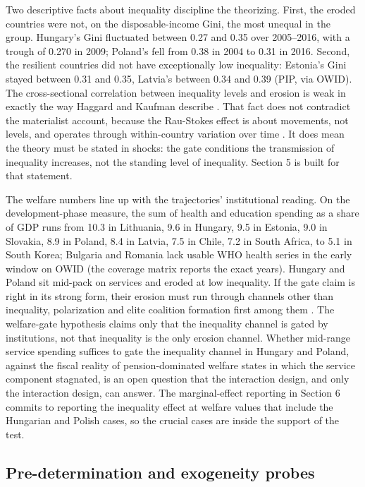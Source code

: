 Two descriptive facts about inequality discipline the theorizing. First, the eroded countries were not, on the disposable-income Gini, the most unequal in the group. Hungary's Gini fluctuated between 0.27 and 0.35 over 2005--2016, with a trough of 0.270 in 2009; Poland's fell from 0.38 in 2004 to 0.31 in 2016. Second, the resilient countries did not have exceptionally low inequality: Estonia's Gini stayed between 0.31 and 0.35, Latvia's between 0.34 and 0.39 (PIP, via OWID). The cross-sectional correlation between inequality levels and erosion is weak in exactly the way Haggard and Kaufman describe \citep{HaggardKaufman2021}. That fact does not contradict the materialist account, because the Rau-Stokes effect is about movements, not levels, and operates through within-country variation over time \citep{RauStokes2025}. It does mean the theory must be stated in shocks: the gate conditions the transmission of inequality increases, not the standing level of inequality. Section 5 is built for that statement.

The welfare numbers line up with the trajectories' institutional reading. On the development-phase measure, the sum of health and education spending as a share of GDP runs from 10.3 in Lithuania, 9.6 in Hungary, 9.5 in Estonia, 9.0 in Slovakia, 8.9 in Poland, 8.4 in Latvia, 7.5 in Chile, 7.2 in South Africa, to 5.1 in South Korea; Bulgaria and Romania lack usable WHO health series in the early window on OWID (the coverage matrix reports the exact years). Hungary and Poland sit mid-pack on services and eroded at low inequality. If the gate claim is right in its strong form, their erosion must run through channels other than inequality, polarization and elite coalition formation first among them \citep{HaggardKaufman2021, Svolik2019}. The welfare-gate hypothesis claims only that the inequality channel is gated by institutions, not that inequality is the only erosion channel. Whether mid-range service spending suffices to gate the inequality channel in Hungary and Poland, against the fiscal reality of pension-dominated welfare states in which the service component stagnated, is an open question that the interaction design, and only the interaction design, can answer. The marginal-effect reporting in Section 6 commits to reporting the inequality effect at welfare values that include the Hungarian and Polish cases, so the crucial cases are inside the support of the test.

\subsection{Pre-determination and exogeneity probes}

